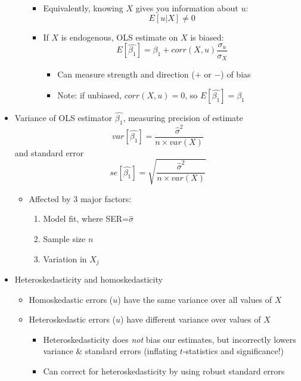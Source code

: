 \documentclass{article}
\begin{document}
\begin{itemize}
\begin{itemize}
\begin{itemize}
			\item Equivalently, knowing $X$ gives you information about $u$: 
				\begin{equation*}
 	E[u|X] \neq 0
 	\end{equation*}
			\item If $X$ is endogenous, OLS estimate on $X$ is biased: 
			\begin{equation*}
E[\hat{\beta_1}]=\beta_1+corr(X,u)\frac{\sigma_u}{\sigma_X}
		\end{equation*}
			\begin{itemize}
				\item Can measure strength and direction ($+$ or $-$) of bias 
				\item Note: if unbiased, $corr(X,u)=0$, so $E[\hat{\beta_1}]=\beta_1$
			\end{itemize}
		\end{itemize}
	\end{itemize}  
	\item Variance of OLS estimator $\hat{\beta_1}$, measuring precision of estimate
			\begin{equation*}
		var[\hat{\beta_1}]=\frac{\hat{\sigma}^2}{n\times var(X)}
		\end{equation*}
		and standard error 
	\begin{equation*}
		se[\hat{\beta_1}]=\sqrt{\frac{\hat{\sigma}^2}{n\times var(X)}}
		\end{equation*}
	\begin{itemize}
	\item Affected by 3 major factors: 
	\begin{enumerate}
		\item Model fit, where SER=$\hat{\sigma}$
		\item Sample size $n$
		\item Variation in $X_j$
	\end{enumerate}
	\end{itemize}
	\item Heteroskedasticity and homoskedasticity
	\begin{itemize}
		\item Homoskedastic errors ($u$) have the same variance over all values of $X$
		\item Heteroskedastic errors ($u$) have different variance over values of $X$
		\begin{itemize}
			\item Heteroskedasticity does \emph{not} bias our estimates, but incorrectly lowers variance \& standard errors (inflating $t$-statistics and significance!) 
			\item Can correct for heteroskedasticity by using robust standard errors 
		\end{itemize}
	\end{itemize} 
\end{itemize}
\end{document}
